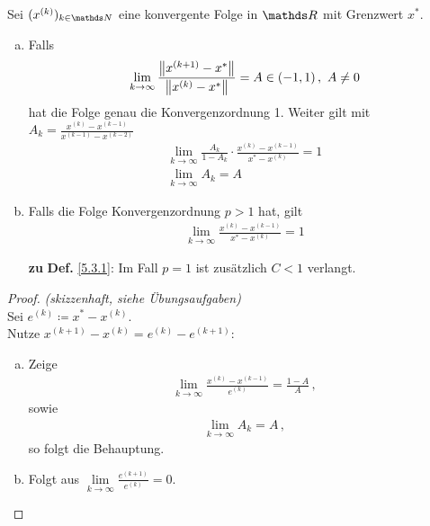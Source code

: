\begin{Leme}
  \label{5.3.5}
  Sei $(x^{(k)})_{k\in\N}$ eine konvergente Folge in $\R$ mit Grenzwert $x^{*}$.
  \begin{enumerate}[a)]
  \item Falls 
    \begin{gather}
      \lim\limits_{k\rightarrow \infty}\frac{\nn[x^{(k+1)}-x^{*}]}{\nn[x^{(k)}-x^{*}]}=
      A\in (-1,1)\, ,~ A\neq 0
      \label{V.3.1}
    \end{gather}
    hat die Folge genau die Konvergenzordnung 1.
    Weiter gilt mit $A_k=\frac{x^{(k)}-x^{(k-1)}}{x^{(k-1)}-x^{(k-2)}}$
    \begin{gather}
      \lim\limits_{k\rightarrow \infty}\frac{A_k}{1-A_k}\cdot 
      \frac{x^{(k)}-x^{(k-1)}}{x^{*}-x^{(k)}}=1 
      \label{V.3.2}
      \\ \nonumber
      \lim\limits_{k\rightarrow\infty}A_k=A
    \end{gather}
  \item Falls die Folge Konvergenzordnung $p>1$ hat, gilt
    \begin{gather}
      \lim\limits_{k\rightarrow\infty}\frac{x^{(k)}-x^{(k-1)}}{x^{*}-x^{(k)}}=1
      \label{V.3.3}
    \end{gather}
  \item[\textbf{zu}]\textbf{Def.} \ref{5.3.1}:  Im Fall $p=1$ ist zusätzlich $C<1 $ verlangt.
  \end{enumerate}
\end{Leme} 

\begin{proof}
  \textit{(skizzenhaft, siehe Übungsaufgaben)}\\
  Sei $e^{(k)}\coloneqq x^{*}-x^{(k)}$.\\
  Nutze $x^{(k+1)}-x^{(k)} = e^{(k)}-e^{(k+1)}$:
  \begin{enumerate}[a)]
  \item Zeige 
    \begin{gather*} 
      \lim\limits_{k\rightarrow\infty}\frac{x^{(k)}-x^{(k-1)}}{e^{(k)}} = \frac{1-A}{A}\, ,
    \end{gather*}
    sowie
    \begin{gather*}
      \lim\limits_{k\rightarrow \infty}A_k = A \, ,
    \end{gather*}
    so folgt die Behauptung.
  \item Folgt aus $\lim\limits_{k\rightarrow\infty} \frac{e^{(k+1)}}{e^{(k)}} =0$.
  \end{enumerate}
\end{proof}


